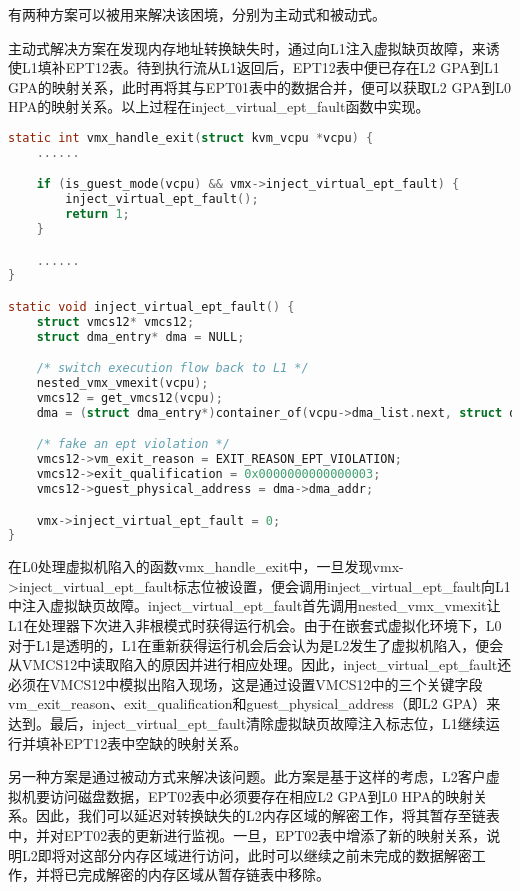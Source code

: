 有两种方案可以被用来解决该困境，分别为主动式和被动式。

主动式解决方案在发现内存地址转换缺失时，通过向L1注入虚拟缺页故障，来诱使L1填补EPT12表。待到执行流从L1返回后，EPT12表中便已存在L2 GPA到L1 GPA的映射关系，此时再将其与EPT01表中的数据合并，便可以获取L2 GPA到L0 HPA的映射关系。以上过程在inject\_virtual\_ept\_fault函数中实现。

\begin{lstlisting}[language={C}, caption={inject\_virtual\_ept\_fault实现源代码}]
static int vmx_handle_exit(struct kvm_vcpu *vcpu) {
	......

    if (is_guest_mode(vcpu) && vmx->inject_virtual_ept_fault) {
        inject_virtual_ept_fault();
        return 1;
    }

	......
}

static void inject_virtual_ept_fault() {	
    struct vmcs12* vmcs12;
    struct dma_entry* dma = NULL;

    /* switch execution flow back to L1 */
    nested_vmx_vmexit(vcpu);
    vmcs12 = get_vmcs12(vcpu);
    dma = (struct dma_entry*)container_of(vcpu->dma_list.next, struct dma_entry, next_entry);

    /* fake an ept violation */
    vmcs12->vm_exit_reason = EXIT_REASON_EPT_VIOLATION;
    vmcs12->exit_qualification = 0x0000000000000003;
    vmcs12->guest_physical_address = dma->dma_addr;

    vmx->inject_virtual_ept_fault = 0;
}
\end{lstlisting}

在L0处理虚拟机陷入的函数vmx\_handle\_exit中，一旦发现vmx->inject\_virtual\_ept\_fault标志位被设置，便会调用inject\_virtual\_ept\_fault向L1中注入虚拟缺页故障。inject\_virtual\_ept\_fault首先调用nested\_vmx\_vmexit让L1在处理器下次进入非根模式时获得运行机会。由于在嵌套式虚拟化环境下，L0对于L1是透明的，L1在重新获得运行机会后会认为是L2发生了虚拟机陷入，便会从VMCS12中读取陷入的原因并进行相应处理。因此，inject\_virtual\_ept\_fault还必须在VMCS12中模拟出陷入现场，这是通过设置VMCS12中的三个关键字段vm\_exit\_reason、exit\_qualification和guest\_physical\_address（即L2 GPA）来达到。最后，inject\_virtual\_ept\_fault清除虚拟缺页故障注入标志位，L1继续运行并填补EPT12表中空缺的映射关系。

另一种方案是通过被动方式来解决该问题。此方案是基于这样的考虑，L2客户虚拟机要访问磁盘数据，EPT02表中必须要存在相应L2 GPA到L0 HPA的映射关系。因此，我们可以延迟对转换缺失的L2内存区域的解密工作，将其暂存至链表中，并对EPT02表的更新进行监视。一旦，EPT02表中增添了新的映射关系，说明L2即将对这部分内存区域进行访问，此时可以继续之前未完成的数据解密工作，并将已完成解密的内存区域从暂存链表中移除。

